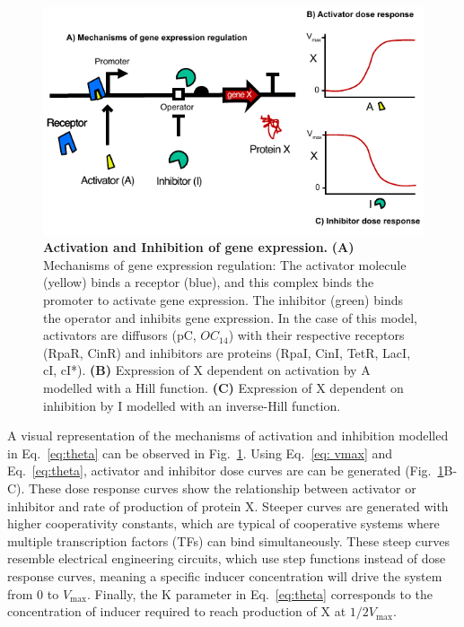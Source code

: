 \begin{figure}[H] %
    \centering
    \begin{adjustbox}{center}
        \includegraphics[width=1\textwidth]{chapters/Chapter 2/activation_inhibition2} %
    \end{adjustbox}
    \caption{\textbf{Activation and Inhibition of gene expression.} \textbf{(A)} Mechanisms of gene expression regulation:
    The activator molecule (yellow) binds a receptor (blue),
        and this complex binds the promoter to activate gene expression.
    The inhibitor (green) binds the operator and inhibits gene expression.
    In the case of this model, activators are diffusors (pC, $OC_{14}$) with their respective receptors (RpaR, CinR) and inhibitors are proteins (RpaI, CinI, TetR, LacI, cI, cI*).
    \textbf{(B)} Expression of X dependent on activation by A modelled with a Hill function.
    \textbf{(C)} Expression of X dependent on inhibition by I modelled with an inverse-Hill function.}
    \label{fig:activation_inhibition} %
\end{figure}

A visual representation of the mechanisms of activation and inhibition
modelled in Eq.~\ref{eq:theta} can be observed in Fig.~\ref{fig:activation_inhibition}.
Using Eq.~\ref{eq: vmax} and Eq.~\ref{eq:theta}, activator and inhibitor dose curves are can be generated
(Fig.~\ref{fig:activation_inhibition}B-C).
These dose response curves show the relationship between activator or inhibitor and rate of production of protein X.
Steeper curves are generated with higher cooperativity constants,
which are typical of cooperative systems where multiple transcription factors (TFs) can bind simultaneously.
These steep curves resemble electrical engineering circuits,
which use step functions instead of dose response curves,
meaning a specific inducer concentration will drive the system from 0 to $V_{\max}$.
Finally,
the K parameter in Eq.~\ref{eq:theta} corresponds to the concentration of inducer
required to reach production of X at  $1/2 V_{\max}$.


